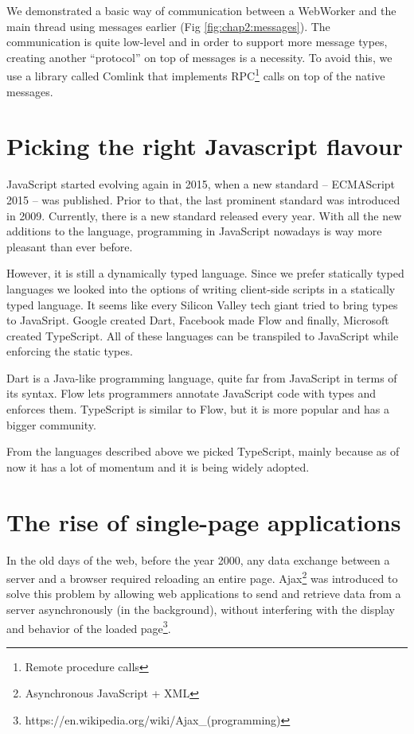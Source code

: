 We demonstrated a basic way of communication between a WebWorker and the main thread using messages earlier (Fig \ref{fig:chap2:messages}). The communication is
quite low-level and in order to support more message types, creating another ``protocol'' on top of messages is a necessity. To avoid this, we use
a library called Comlink \cite{Comlink} that implements RPC\footnote{Remote procedure calls} calls on top of the native messages.

\section{Picking the right Javascript flavour}
JavaScript started evolving again in 2015, when a new standard -- ECMAScript 2015 -- was published. Prior to that, the last prominent
standard was introduced in 2009. Currently, there is a new standard released every year. With all the new additions to the language, programming in
JavaScript nowadays is way more pleasant than ever before.

However, it is still a dynamically typed language. Since we prefer statically typed languages we looked into the options of writing client-side scripts in
a statically typed language. It seems like every Silicon Valley tech giant tried to bring types to JavaSript. Google created Dart,
Facebook made Flow and finally, Microsoft created TypeScript. All of these languages can be transpiled to JavaScript while enforcing the static types.

Dart is a Java-like programming language, quite far from JavaScript in terms of its syntax. Flow lets programmers
annotate JavaScript code with types and enforces them. TypeScript is similar to Flow, but it is more popular and has a bigger community.

From the languages described above we picked TypeScript, mainly because as of now it has a lot of momentum and it is being widely adopted.

\section{The rise of single-page applications}
\label{chap2:spa}
In the old days of the web, before the year 2000, any data exchange between a server and a browser required reloading an entire page. 
Ajax\footnote{Asynchronous JavaScript + XML} was introduced to solve this problem by allowing web applications to send and retrieve data from
a server asynchronously (in the background), without interfering with the display and behavior of the loaded
page\footnote{https://en.wikipedia.org/wiki/Ajax\_(programming)}.

